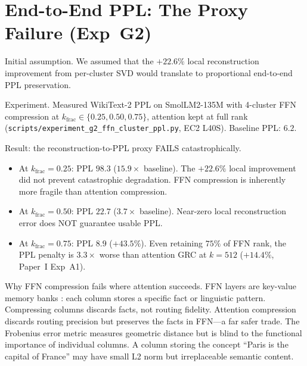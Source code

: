 \documentclass[11pt]{article}
\begin{document}
\section{End-to-End PPL: The Proxy Failure (Exp~G2)}
\label{sec:g2-ppl}

Initial assumption.  We assumed that the $+22.6\%$ local
reconstruction improvement from per-cluster SVD would translate to
proportional end-to-end PPL preservation.

Experiment.  Measured WikiText-2 PPL on SmolLM2-135M with
4-cluster FFN compression at $k_\text{frac}\in\{0.25,0.50,0.75\}$,
attention kept at full rank (\texttt{scripts/experiment\_g2\_ffn\_cluster\_ppl.py},
EC2 L40S).  Baseline PPL: $6.2$.

Result: the reconstruction-to-PPL proxy FAILS catastrophically.
\begin{itemize}
\item At $k_\text{frac}{=}0.25$: PPL $98.3$ ($15.9{\times}$ baseline).
      The $+22.6\%$ local improvement did not prevent catastrophic
      degradation.  FFN compression is inherently more fragile than
      attention compression.
\item At $k_\text{frac}{=}0.50$: PPL $22.7$ ($3.7{\times}$ baseline).
      Near-zero local reconstruction error does NOT guarantee usable PPL.
\item At $k_\text{frac}{=}0.75$: PPL $8.9$ ($+43.5\%$).  Even retaining
      $75\%$ of FFN rank, the PPL penalty is $3.3{\times}$ worse than
      attention GRC at $k{=}512$ ($+14.4\%$, Paper~I Exp~A1).
\end{itemize}

Why FFN compression fails where attention succeeds.  FFN layers
are key-value memory banks \cite{geva2021ffn}: each column stores a
specific fact or linguistic pattern.  Compressing columns discards
facts, not routing fidelity.  Attention compression discards
routing precision but preserves the facts in FFN---a far safer trade.
The Frobenius error metric measures geometric distance but is blind to
the functional importance of individual columns.  A column storing the
concept ``Paris is the capital of France'' may have small L2 norm but
irreplaceable semantic content.
\end{document}
